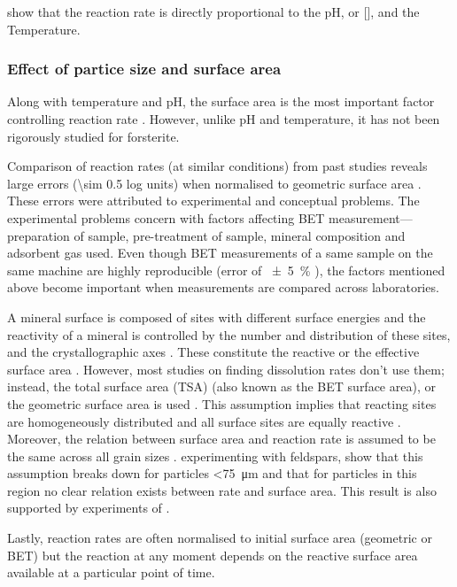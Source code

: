  show that the reaction rate is directly proportional to the pH, or [], and the Temperature. 
\subsubsection{Effect of partice size and surface area}\label{subsec:sa_sec}
Along with temperature and pH, the surface area is the most important factor controlling reaction rate \citep{rimstidt2012}. However, unlike pH and temperature, it has not been rigorously studied for forsterite. 

Comparison of reaction rates (at similar conditions) from past studies reveals large errors (\num{\sim 0.5} log units) when normalised to geometric surface area \citep{rimstidt2012}. These errors were attributed to experimental and conceptual problems. The experimental problems concern with factors affecting BET measurement--- preparation of sample, pre-treatment of sample, mineral composition and adsorbent gas used\;\citep{brantley2000,rimstidt2012,rosso2000}. Even though BET measurements of a same sample on the same machine are highly reproducible (error of \SI{\pm 5}{\percent} \citep{brantley2000}), the factors mentioned above become important when measurements are compared across laboratories. 

A mineral surface is composed of sites with different surface energies and the reactivity of a mineral is controlled by the number and distribution of these sites, and the crystallographic axes	\citep{grandstaff1978,awad2000,Brantley2008c}. These constitute the reactive \citep{white1990} or the effective surface area \citep{aagaard1982,helgeson1984}. However, most studies on finding dissolution rates don't use them; instead, the total surface area (TSA) (also known as the BET surface area), or the geometric surface area is used \citep{Brantley2008c}. This assumption implies that reacting sites are homogeneously distributed and all surface sites are equally reactive\; \citep{grandstaff1978,white1990}. Moreover, the relation between surface area and reaction rate is assumed to be the same across all grain sizes \citep{grandstaff1978}. \cite{holdren1987} experimenting with feldspars, show that this assumption breaks down for particles \SI{<75}{\micro\meter} and that for particles in this region no clear relation exists between rate and surface area. This result is also supported by experiments of \cite{kleiv2006}.

Lastly, reaction rates are often normalised to initial surface area (geometric or BET) but the reaction at any moment depends on the reactive surface area available at a particular point of time. 

